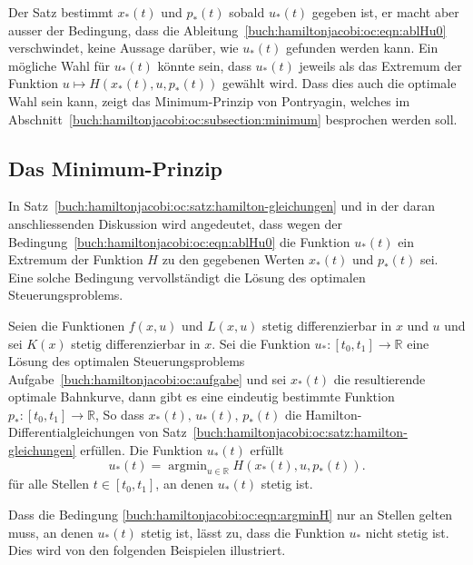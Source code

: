 Der Satz bestimmt $x_*(t)$ und $p_*(t)$ sobald $u_*(t)$ gegeben ist,
er macht aber ausser der Bedingung, dass die
Ableitung~\eqref{buch:hamiltonjacobi:oc:eqn:ablHu0} verschwindet,
keine Aussage darüber, wie $u_*(t)$ gefunden werden kann.
Ein mögliche Wahl für $u_*(t)$ könnte sein, dass $u_*(t)$ jeweils
als das Extremum der Funktion $u\mapsto H(x_*(t),u,p_*(t))$
gewählt wird.
Dass dies auch die optimale Wahl sein kann, zeigt das Minimum-Prinzip
von Pontryagin, welches im
Abschnitt~\ref{buch:hamiltonjacobi:oc:subsection:minimum}
besprochen werden soll.

%
%
\subsection{Das Minimum-Prinzip
\label{buch:hamiltonjacobi:oc:subsection:minimum}}
In Satz~\ref{buch:hamiltonjacobi:oc:satz:hamilton-gleichungen}
und in der daran anschliessenden Diskussion wird angedeutet, dass
wegen der Bedingung~\eqref{buch:hamiltonjacobi:oc:eqn:ablHu0}
die Funktion $u_*(t)$ ein Extremum der Funktion $H$ zu den gegebenen
Werten $x_*(t)$ und $p_*(t)$ sei.
Eine solche Bedingung vervollständigt die Lösung des optimalen
Steuerungsproblems.

\begin{satz}[Pontryagin]
Seien die Funktionen $f(x,u)$ und $L(x,u)$ stetig differenzierbar in 
$x$ und $u$ und sei $K(x)$ stetig differenzierbar in $x$.
Sei die Funktion $u_*\colon[t_0,t_1]\to\mathbb{R}$ eine Lösung des
optimalen Steuerungsproblems Aufgabe~\ref{buch:hamiltonjacobi:oc:aufgabe}
und sei $x_*(t)$ die resultierende optimale Bahnkurve, dann gibt es
eine eindeutig bestimmte Funktion $p_*\colon[t_0,t_1]\to\mathbb{R}$,
So dass $x_*(t),\,u_*(t),\,p_*(t)$ die Hamilton-Differentialgleichungen
von Satz~\ref{buch:hamiltonjacobi:oc:satz:hamilton-gleichungen}
erfüllen.
Die Funktion $u_*(t)$ erfüllt
\begin{equation}
u_*(t)
=
\operatorname{argmin}_{u\in\mathbb{R}} H(x_*(t),u,p_*(t)).
\label{buch:hamiltonjacobi:oc:eqn:argminH}
\end{equation}
für alle Stellen $t\in[t_0,t_1]$, an denen $u_*(t)$ stetig ist.
\end{satz}

Dass die Bedingung \eqref{buch:hamiltonjacobi:oc:eqn:argminH} nur
an Stellen gelten muss, an denen $u_*(t)$ stetig ist, lässt zu,
dass die Funktion $u_*$ nicht stetig ist.
Dies wird von den folgenden Beispielen illustriert.



